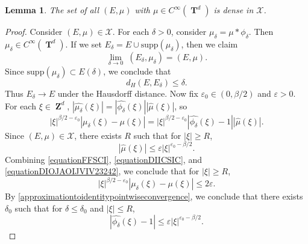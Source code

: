 \documentclass[12pt,reqno]{article}
\numberwithin{equation}{section}
\DeclareMathOperator{\ZZ}{\mathbf{Z}}
\DeclareMathOperator{\TT}{\mathbf{T}}
\newtheorem{lemma}{Lemma}
\begin{document}
\begin{lemma} \label{smoothdensitylemma}
    The set of all $(E,\mu)$ with $\mu \in C^\infty(\TT^d)$ is dense in $\mathcal{X}$.
\end{lemma}
\begin{proof}
    Consider $(E,\mu) \in \mathcal{X}$. For each $\delta > 0$, consider $\mu_\delta = \mu * \phi_\delta$. Then $\mu_\delta \in C^\infty(\TT^d)$. If we set $E_\delta = E \cup \text{supp}(\mu_\delta)$, then we claim
    \begin{equation} \label{equationFFSPCOS}
        \lim_{\delta \to 0}\; (E_\delta, \mu_\delta) = (E,\mu).
    \end{equation}
    Since $\text{supp}(\mu_\delta) \subset E(\delta)$, we conclude that
    \begin{equation} \label{equationFFSICSI}
        d_H(E,E_\delta) \leq \delta.
    \end{equation}
    Thus $E_\delta \to E$ under the Hausdorff distance. Now fix $\varepsilon_0 \in (0,\beta/2)$ and $\varepsilon > 0$. For each $\xi \in \ZZ^d$, $|\widehat{\mu_\delta}(\xi)| = |\widehat{\phi_\delta}(\xi)| |\widehat{\mu}(\xi)|$, so
    \begin{equation} \label{equationFFSCI}
        |\xi|^{\beta/2 - \varepsilon_0} |\mu_\delta(\xi) - \mu(\xi)| = |\xi|^{\beta/2 - \varepsilon_0} |\widehat{\phi_\delta}(\xi) - 1| |\widehat{\mu}(\xi)|.
    \end{equation}
    Since $(E,\mu) \in \mathcal{X}$, there exists $R$ such that for $|\xi| \geq R$,
    \begin{equation} \label{equationDIICSIC}
        |\widehat{\mu}(\xi)| \leq \varepsilon |\xi|^{\varepsilon_0-\beta/2}.
    \end{equation}
    Combining \eqref{equationFFSCI}, \eqref{equationDIICSIC}, and \eqref{equationDIOJAOIJVIV23242}, we conclude that for $|\xi| \geq R$,
    \begin{equation} \label{equationDSCISIIXX}
        |\xi|^{\beta/2 - \varepsilon_0} |\mu_\delta(\xi) - \mu(\xi)| \leq 2 \varepsilon.
    \end{equation}
    By \eqref{approximationtoidentitypointwiseconvergence}, we conclude that there exists $\delta_0$ such that for $\delta \leq \delta_0$ and $|\xi| \leq R$,
    \begin{equation} \label{equationDISCIIS}
        |\widehat{\phi_\delta}(\xi) - 1| \leq \varepsilon |\xi|^{\varepsilon_0 - \beta/2}.
    \end{equation}

\end{proof}
\end{document}
